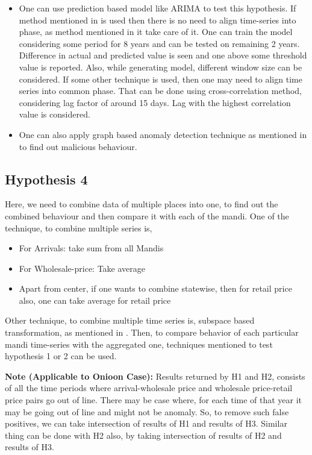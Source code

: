 \begin{itemize}

\item One can use prediction based model like ARIMA \cite{arima} to test this hypothesis. If method mentioned in \cite{arima} is used then there is no need to align time-series into phase, as method mentioned in it take care of it. One can train the model considering some period for 8 years and can be tested on remaining 2 years. Difference in actual and predicted value is seen and one above some threshold value is reported. Also, while generating model, different window size can be considered. If some other technique is used, then one may need to align time series into common phase. That can be done using cross-correlation method, considering lag factor of around 15 days. Lag with the highest correlation value is considered.

\item One can also apply graph based anomaly detection technique as mentioned in \cite{nasa} to find out malicious behaviour.

\end{itemize}

\subsection{Hypothesis 4}


Here, we need to combine data of multiple places into one, to find out the combined behaviour and then compare it with each of the mandi. One of the technique, to combine multiple series is, 

\begin{itemize}

\item For Arrivals: take sum from all Mandis
\item For Wholesale-price: Take average
\item Apart from center, if one wants to combine statewise, then for retail price also, one can take average for retail price

\end{itemize}

Other technique, to combine multiple time series is, subspace based transformation, as mentioned in \cite{phdthesisdc}. Then, to compare behavior of each particular mandi time-series with the aggregated one, techniques mentioned to test hypothesis 1 or 2 can be used.

\textbf{Note (Applicable to Onioon Case):} Results returned by H1 and H2, consists of all the time periods where arrival-wholesale price and wholesale price-retail price pairs go out of line. There may be case where, for each time of that year it may be going out of line and might not be anomaly. So, to remove such false positives, we can take intersection of results of H1 and results of H3. Similar thing can be done with H2 also, by taking  intersection of results of H2 and results of H3.


